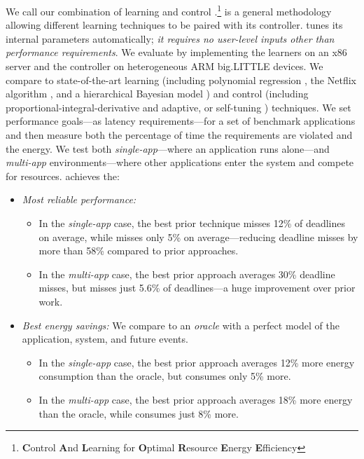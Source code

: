 We call our combination of learning and control
\SYSTEM{}.\footnote{\textbf{C}ontrol \textbf{A}nd \textbf{L}earning
  for \textbf{O}ptimal \textbf{R}esource \textbf{E}nergy
  \textbf{E}fficiency} \SYSTEM{} is a general methodology allowing
different learning techniques to be paired with its controller.
\SYSTEM{} tunes its internal parameters automatically; \ie{} \emph{it
  requires no user-level inputs other than performance requirements}.
We evaluate \SYSTEM{} by implementing the learners on an x86 server
and the controller on heterogeneous ARM big.LITTLE devices.  We
compare to state-of-the-art learning (including polynomial regression
\cite{Koala,dubach2010}, the Netflix algorithm \cite{netflix,Paragon},
and a hierarchical Bayesian model \cite{LEO}) and control (including
proportional-integral-derivative \cite{Hellerstein2004a} and adaptive,
or self-tuning \cite{HandbookControl}) techniques.  We set performance
goals---as latency requirements---for a set of benchmark applications
and then measure both the percentage of time the requirements are
violated and the energy.  We test both \emph{single-app}---where an
application runs alone---and \emph{multi-app} environments---where
other applications enter the system and compete for resources.
\SYSTEM{} achieves the:
\begin{itemize}[leftmargin=1em]
\item \textit{Most reliable performance:}
  \begin{itemize}[leftmargin=1em]
  \item In the \emph{single-app} case, the best prior technique misses
    12\% of deadlines on average, while \SYSTEM{} misses only 5\% on
    average---reducing deadline misses by more than 58\% compared to
    prior approaches.
  \item In the \emph{multi-app} case, the best prior approach averages
    30\% deadline misses, but \SYSTEM{} misses just 5.6\% of
    deadlines---a huge improvement over prior work.
  \end{itemize}
\item \textit{Best energy savings:} We compare to an \emph{oracle}
  with a perfect model of the application, system, and future events.
  \begin{itemize}[leftmargin=1em]
  \item In the \emph{single-app} case, the best prior approach
    averages 12\% more energy consumption than the oracle, but
    \SYSTEM{} consumes only 5\% more.
  \item In the \emph{multi-app} case, the best prior approach averages
    18\% more energy than the oracle, while \SYSTEM{} consumes just
    8\% more.
  \end{itemize}
\end{itemize}

